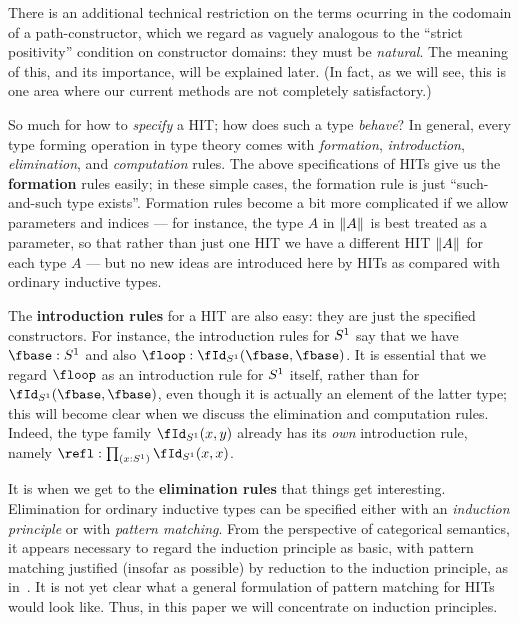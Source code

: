 \documentclass{amsart}
\begin{document}
There is an additional technical restriction on the terms ocurring in the codomain of a path-constructor, which we regard as vaguely analogous to the ``strict positivity'' condition on constructor domains: they must be \emph{natural}.
The meaning of this, and its importance, will be explained later.
%
(In fact, as we will see, this is one area where our current methods are not completely satisfactory.)

So much for how to \emph{specify} a HIT; how does such a type \emph{behave}?
In general, every type forming operation in type theory comes with \emph{formation}, \emph{introduction}, \emph{elimination}, and \emph{computation} rules.
The above specifications of HITs give us the \textbf{formation} rules easily; in these simple cases, the formation rule is just ``such-and-such type exists''.
Formation rules become a bit more complicated if we allow parameters and indices --- for instance, the type $A$ in $\mathopen{}\left\Vert A\right\Vert_{}\mathclose{}$ is best treated as a parameter, so that rather than just one HIT we have a different HIT $\mathopen{}\left\Vert A\right\Vert_{}\mathclose{}$ for each type $A$ --- but no new ideas are introduced here by HITs as compared with ordinary inductive types.

The \textbf{introduction rules} for a HIT are also easy: they are just the specified constructors.
For instance, the introduction rules for $S^1$ say that we have $\fbase:\circtype$ and also $\floop : \id[\circtype]\fbase\fbase$.
It is essential
%
that we regard $\floop$ as an introduction rule for $S^1$ itself, rather than for $\id[\circtype]\fbase\fbase$, even though it is actually an element of the latter type; this will become clear when we discuss the elimination and computation rules.
Indeed, the type family $\id[\circtype]{x}{y}$ already has its \emph{own} introduction rule, namely $\refl: \prd{x:\circtype} \id[\circtype]{x}{x}$.

It is when we get to the \textbf{elimination rules} that things get interesting.
Elimination for ordinary inductive types can be specified either with an \emph{induction principle} or with \emph{pattern matching}.
From the perspective of categorical semantics, it appears necessary to regard the induction principle as basic, with pattern matching justified (insofar as possible) by reduction to the induction principle, as in~\cite{gmm:pattern-matching,cdp:without-k}.
It is not yet clear what a general formulation of pattern matching for HITs would look like.
Thus, in this paper we will concentrate on induction principles.
\end{document}
